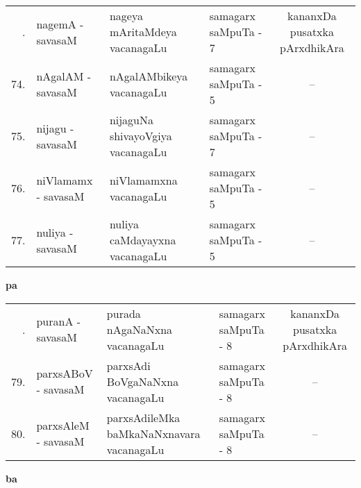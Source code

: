 {\renewcommand{\arraystretch}{1.35}
\begin{longtable}{rl>{\raggedright}p{5.5cm}lc}
\endfirsthead
\endhead
\endfoot
\endlastfoot
73. & nagemA - savasaM &  nageya mAritaMdeya vacanagaLu & samagarx saMpuTa - 7 & kananxDa pusatxka pArxdhikAra\\
74. & nAgalAM  - savasaM & nAgalAMbikeya vacanagaLu & samagarx saMpuTa - 5 & --\\
75. & nijagu  - savasaM & nijaguNa shivayoVgiya vacanagaLu & samagarx saMpuTa - 7 & --\\
76. & niVlamamx  - savasaM & niVlamamxna vacanagaLu & samagarx saMpuTa - 5 & --\\
77. & nuliya  - savasaM & nuliya caMdayayxna vacanagaLu & samagarx saMpuTa - 5 & --\\
\end{longtable}}
\smallskip

\centerline{\bf pa}

{\renewcommand{\arraystretch}{1.35}
\begin{longtable}{rl>{\raggedright}p{5.5cm}lc}
\endfirsthead
\endhead
\endfoot
\endlastfoot
78. & puranA - savasaM &  purada nAgaNaNxna vacanagaLu & samagarx saMpuTa - 8 & kananxDa pusatxka pArxdhikAra\\
79. & parxsABoV - savasaM & parxsAdi BoVgaNaNxna vacanagaLu & samagarx saMpuTa - 8 & --\\
80. & parxsAleM - savasaM & parxsAdileMka baMkaNaNxnavara vacanagaLu & samagarx saMpuTa - 8 & --\\
\end{longtable}}

\smallskip

\centerline{\bf ba}

